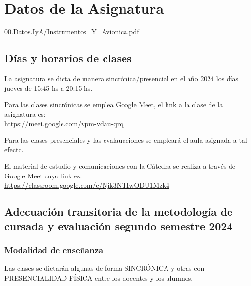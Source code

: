 %

\chapter*{Datos de la Asignatura}
\label{chap:00.datos.de.IyA}

  
  {00.Datos.IyA/Instrumentos_Y_Avionica.pdf}


\section{Días y horarios de clases}
\label{sec:dias+horarios.clases}

La asignatura se dicta de manera sincrónica/presencial en el año 2024
los días jueves de 15:45 hs a 20:15 hs.

Para las clases sincrónicas se emplea Google Meet,
 el link a la clase de la asignatura es: \\
\href{https://meet.google.com/vpm-vdau-qrq}{https://meet.google.com/vpm-vdau-qrq}

Para las clases presenciales y las evalauaciones se empleará el aula asignada a tal efecto.

El material de estudio y comunicaciones con la Cátedra se realiza a través de Google Meet cuyo link es: \\
\href{https://classroom.google.com/c/Njk3NTIwODU1Mzk4}{https://classroom.google.com/c/Njk3NTIwODU1Mzk4}



\section*{Adecuación transitoria de la metodología de cursada  y evaluación \mbox{segundo} semestre 2024}
\label{00.Adecuacion.transitoria}


\subsection*{Modalidad de enseñanza} 

Las clases se dictarán algunas de forma SINCRÓNICA y otras con PRESENCIALIDAD FÍSICA entre los docentes y los alumnos.

